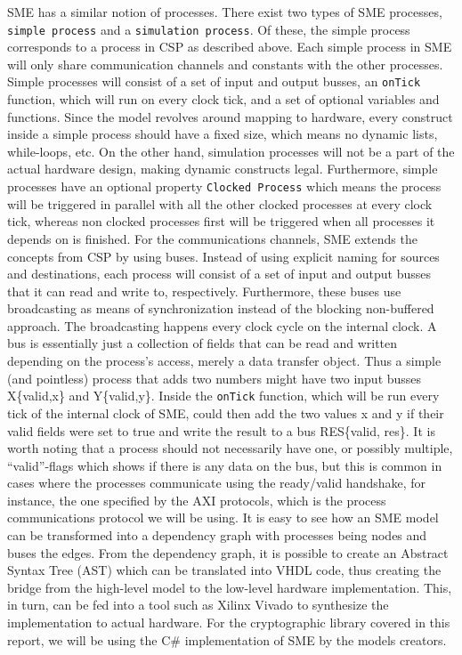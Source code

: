 \documentclass[a4paper, openany]{book}
\begin{document}
\begin{abstact}
SME has a similar notion of processes. There exist two types of SME processes, \texttt{simple process} and a \texttt{simulation process}. Of these, the simple process corresponds to a process in CSP as described above. Each simple process in SME will only share communication channels and constants with the other processes. Simple processes will consist of a set of input and output busses, an \texttt{onTick} function, which will run on every clock tick, and a set of optional variables and functions. Since the model revolves around mapping to hardware, every construct inside a simple process should have a fixed size, which means no dynamic lists, while-loops, etc. On the other hand, simulation processes will not be a part of the actual hardware design, making dynamic constructs legal. Furthermore, simple processes have an optional property \texttt{Clocked Process} which means the process will be triggered in parallel with all the other clocked processes at every clock tick, whereas non clocked processes first will be triggered when all processes it depends on is finished.
For the communications channels, SME extends the concepts from CSP by using buses. Instead of using explicit naming for sources and destinations, each process will consist of a set of input and output busses that it can read and write to, respectively. Furthermore, these buses use broadcasting as means of synchronization instead of the blocking non-buffered approach.  The broadcasting happens every clock cycle on the internal clock.
A bus is essentially just a collection of fields that can be read and written depending on the process's access, merely a data transfer object. Thus a simple (and pointless) process that adds two numbers might have two input busses X\{valid,x\} and Y\{valid,y\}. Inside the \texttt{onTick} function, which will be run every tick of the internal clock of SME, could then add the two values x and y if their valid fields were set to true and write the result to a bus RES\{valid, res\}. It is worth noting that a process should not necessarily have one, or possibly multiple, ``valid''-flags which shows if there is any data on the bus, but this is common in cases where the processes communicate using the ready/valid handshake, for instance, the one specified by the AXI protocols, which is the process communications protocol we will be using. It is easy to see how an SME model can be transformed into a dependency graph with processes being nodes and buses the edges. From the dependency graph, it is possible to create an Abstract Syntax Tree (AST) which can be translated into VHDL code\cite{sme}, thus creating the bridge from the high-level model to the low-level hardware implementation. This, in turn, can be fed into a tool such as Xilinx Vivado to synthesize the implementation to actual hardware. For the cryptographic library covered in this report, we will be using the C\# implementation of SME by the models creators\cite{sme}.

\end{abstact}
\end{document}
